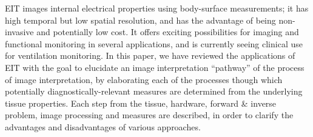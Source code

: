 \documentclass[12pt]{article} \usepackage[margin=3cm]{geometry} \usepackage[margin=20pt,font=small,labelfont=bf]{caption}\def\TBLWIDA{35mm}\def\TBLWIDB{95mm}
\begin{document}
EIT images internal electrical properties using
body-surface measurements; it has high temporal but low
spatial resolution, and has the advantage of being non-invasive
and potentially low cost.
It offers exciting possibilities for imaging and functional 
monitoring in several applications, and is currently
seeing clinical use for ventilation monitoring.
In this paper, we have reviewed the applications of
EIT with the goal to elucidate an image interpretation ``pathway''
of the process of image interpretation,
by elaborating each of the processes though which 
potentially diagnostically-relevant measures are determined
from the underlying tissue properties.
Each step from the tissue, hardware, forward \& inverse problem,
image processing and measures are described, in order
to clarify the advantages and disadvantages of various approaches.
\end{document}
